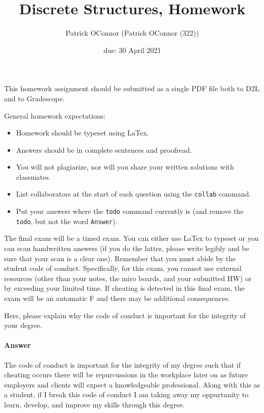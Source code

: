 \documentclass{article}
\title{Discrete Structures, Homework \hwnum}
\author{Patrick OConnor (Patrick OConnor (322))}
\date{due: 30 April 2021}
\begin{document}
\maketitle

This homework assignment should be
submitted as a single PDF file both to D2L and to Gradescope.

General homework expectations:
\begin{itemize}
    \item Homework should be typeset using LaTex.
    \item Answers should be in complete sentences and proofread.
    \item You will not plagiarize, nor will you share your written solutions
        with classmates.
    \item List collaborators at the start of each question using the \texttt{collab} command.
    \item Put your answers where the \texttt{todo} command currently is (and
        remove the \texttt{todo}, but not the word \texttt{Answer}).
\end{itemize}


 

The final exam will be a timed exam.  You can either use LaTex to typeset or you
can scan handwritten answers (if you do the latter, please write legibly and be
sure that your scan is a clear one).  Remember that you must abide by the
student code of conduct.  Specifically, for this exam, you cannot use external
resources (other than your notes, the miro boards, and your submitted HW) or by
exceeding your limited time.  If cheating is detected in this final exam, the
exam will be an automatic F and there may be additional consequences.

Here, please explain why the code of conduct is important for the integrity of
your degree.

\paragraph{Answer}

The code of conduct is important for the integrity of my degree such that if cheating occurs there will 
be repurcussions in the workplace later on as future employers and clients will expect a knowledgeable professional.
Along with this as a student, if I break this code of conduct I am taking away my oppurtunity to learn, develop, and 
improve my skills through this degree. 
\end{document}
